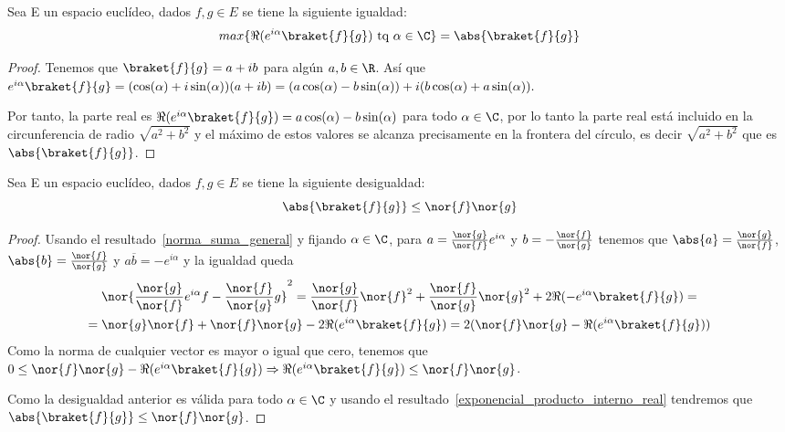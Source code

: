 \begin{proposition}
  \label{exponencial_producto_interno_real}
  Sea E un espacio euclídeo, dados $f,g\in E$ se tiene la siguiente igualdad:
  \begin{equation}
    max\{\Re(e^{i\alpha}\braket{f}{g})\text{ tq }\alpha\in\C\}=\abs{\braket{f}{g}}
  \end{equation}
\end{proposition}
\begin{proof}
  Tenemos que $\braket{f}{g}=a+ib$ para algún $a,b\in\R$. Así que $e^{i\alpha}\braket{f}{g}=(\cos(\alpha)+i \sin(\alpha))(a+ib)=(a \cos(\alpha)-b \sin(\alpha)) + i(b \cos(\alpha)+a\sin(\alpha)).$

  Por tanto, la parte real es $\Re(e^{i\alpha}\braket{f}{g})=a \cos(\alpha)-b \sin(\alpha)$ para todo $\alpha\in\C$, por lo tanto la parte real está incluido en la circunferencia de radio $\sqrt{a^2+b^2}$ y el máximo de estos valores se alcanza precisamente en la frontera del círculo, es decir $\sqrt{a^2+b^2}$ que es $\abs{\braket{f}{g}}$.
\end{proof}
\begin{proposition}
  \label{norma_producto_escalar_producto_norma}
  Sea E un espacio euclídeo, dados $f,g\in E$ se tiene la siguiente desigualdad:
  \begin{equation}
    \abs{\braket{f}{g}}\leq\nor{f}\nor{g}
  \end{equation}
\end{proposition}

\begin{proof}
  Usando el resultado~\eqref{norma_suma_general} y fijando $\alpha\in\C$, para $a=\frac{\nor{g}}{\nor{f}}e^{i\alpha}$ y $b=-\frac{\nor{f}}{\nor{g}}$ tenemos que $\abs{a}=\frac{\nor{g}}{\nor{f}}$, $\abs{b}=\frac{\nor{f}}{\nor{g}}$ y $a\overline{b}=-e^{i\alpha}$ y la igualdad queda
  \begin{multline*}
    \nor{\frac{\nor{g}}{\nor{f}}e^{i\alpha}f-\frac{\nor{f}}{\nor{g}}g}^2=\frac{\nor{g}}{\nor{f}}\nor{f}^2+\frac{\nor{f}}{\nor{g}}\nor{g}^2+2\Re(-e^{i\alpha}\braket{f}{g})=\\
    =\nor{g}\nor{f}+\nor{f}\nor{g}-2\Re(e^{i\alpha}\braket{f}{g})=2(\nor{f}\nor{g}-\Re(e^{i\alpha}\braket{f}{g}))
  \end{multline*}
  Como la norma de cualquier vector es mayor o igual que cero, tenemos que
  $0\leq\nor{f}\nor{g}-\Re(e^{i\alpha}\braket{f}{g})\Rightarrow \Re(e^{i\alpha}\braket{f}{g})\leq\nor{f}\nor{g}$.

  Como la desigualdad anterior es válida para todo $\alpha\in\C$ y usando el resultado~\eqref{exponencial_producto_interno_real} tendremos que $ \abs{\braket{f}{g}}\leq\nor{f}\nor{g}$.
\end{proof}


